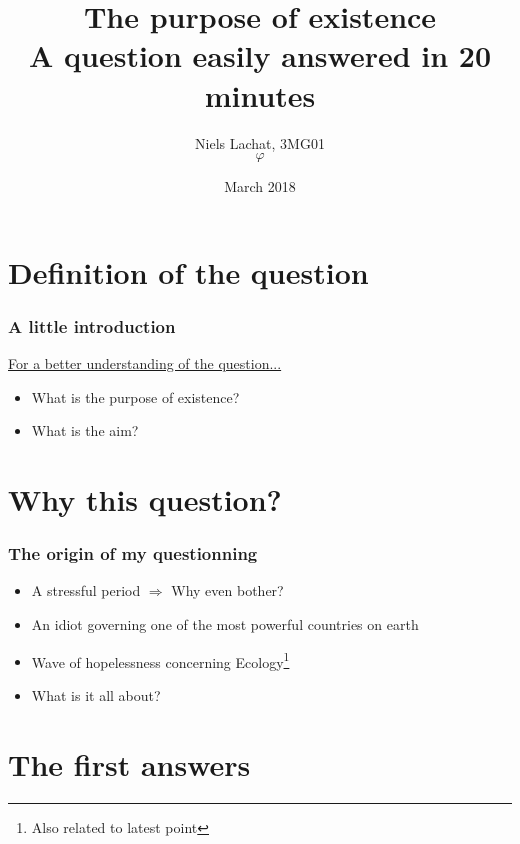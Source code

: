 \documentclass{beamer}
\title{The purpose of existence \\ A question easily answered in 20 minutes}
\author{Niels Lachat, 3MG01 \\ $\varphi$}
\date{March 2018}
\begin{document}
	\maketitle
	
	\tableofcontents
	
	\section{Definition of the question}
	
	\begin{frame}
		\frametitle{A little introduction} 
		\href{../orig.gif}{For a better understanding of the question...} \pause
		
		\begin{itemize}[<+->]
			\item What is the purpose of existence?
			\item What is the aim? 
		\end{itemize}
    \end{frame}
    
    
    \section{Why this question?}
    
    \begin{frame}
    		\frametitle{The origin of my questionning}
    		
    		\begin{itemize}[<+->]
    			\item A stressful period $\Rightarrow$ Why even bother? 
    			\item An idiot governing one of the most powerful countries on earth
    			\item Wave of hopelessness concerning Ecology\footnote{Also related to latest point}
    			\item What is it all about?
    		\end{itemize}
    \end{frame}
    
    
    \section{The first answers}
    
\end{document}
